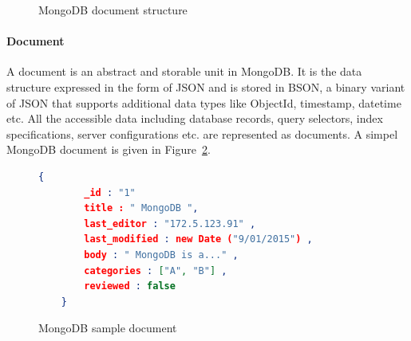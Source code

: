 \begin{figure}[h]
	\centering
	\centering
	\caption{MongoDB document structure~\citep{mongodb:org}}
	\label{fig:mongodb-doc}
	
\end{figure}

\paragraph{Document}
	A document is an abstract and storable unit in MongoDB. It is the data structure expressed in the form of JSON and is stored in BSON, a binary variant of JSON that supports additional data types like ObjectId, timestamp, datetime etc. All the accessible data including database records, query selectors, index specifications, server configurations etc. are represented as documents. A simpel MongoDB document is given in Figure~\ref{sample-mongodb-document}.
	\begin{figure}[h]
	\begin{lstlisting}[language=JSON,basicstyle=\scriptsize]
	{
		_id : "1"
		title : " MongoDB ",
		last_editor : "172.5.123.91" ,
		last_modified : new Date ("9/01/2015") ,
		body : " MongoDB is a..." ,
		categories : ["A", "B"] ,
		reviewed : false
	}
	\end{lstlisting} 
	\caption{MongoDB sample document}
	\label{sample-mongodb-document}
\end{figure}

\label{mong-xmark-indexing}
